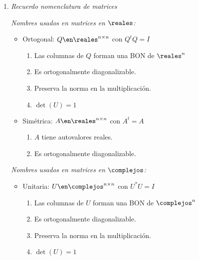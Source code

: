 \begin{enumerate}[label=\tiny\purple{\faIcon{snowman}}]
  \item \textit{Recuerdo nomenclatura de matrices}

        \begin{minipage}{0.5\textwidth}
          \textit{Nombres usados en matrices en $\reales$:}
          \begin{itemize}
            \item Ortogonal: $Q \en \reales^{n \times n}$  con $Q^tQ = I$
                  \begin{enumerate}[label={\tiny\faIcon{atom}}]
                    \item Las columnas de $Q$ forman una BON de $\reales^n$
                    \item Es ortogonalmente diagonalizable.
                    \item Preserva la norma en la multiplicación.
                    \item $\det(U) = 1$
                  \end{enumerate}

            \item Simétrica: $A \en \reales^{n \times n}$  con $A^t = A$
                  \begin{enumerate}[label={\tiny\faIcon{atom}}]
                    \item $A$ tiene autovalores reales.
                    \item Es ortogonalmente diagonalizable.
                  \end{enumerate}

          \end{itemize}
        \end{minipage}
        \begin{minipage}{0.5\textwidth}
          \textit{Nombres usados en matrices en $\complejos$:}
          \begin{itemize}
            \item Unitaria: $U \en \complejos^{n \times n}$  con $U^*U = I$
                  \begin{enumerate}[label={\tiny\faIcon{atom}}]
                    \item Las columnas de $U$ forman una BON de $\complejos^n$
                    \item Es ortogonalmente diagonalizable.
                    \item Preserva la norma en la multiplicación.
                    \item $\det(U) = 1$
                  \end{enumerate}


\end{itemize}
\end{minipage}
\end{enumerate}
